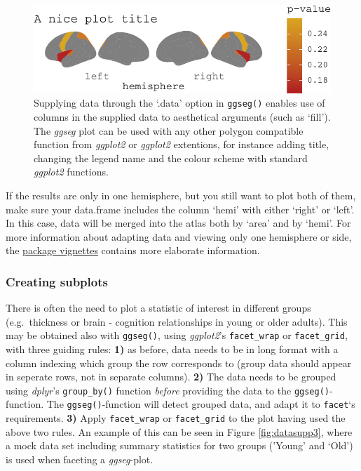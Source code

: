 \documentclass[fleqn,10pt]{wlpeerj} %
\begin{document}
\begin{figure}
\centering
\includegraphics{msc_ggseg_files/figure-latex/datasupp-1.pdf}
\caption{\label{fig:datasupp}Supplying data through the `.data' option in \texttt{ggseg()} enables use of columns in the supplied data to aesthetical arguments (such as `fill'). The \emph{ggseg} plot can be used with any other polygon compatible function from \emph{ggplot2} or \emph{ggplot2} extentions, for instance adding title, changing the legend name and the colour scheme with standard \emph{ggplot2} functions.}
\end{figure}

If the results are only in one hemisphere, but you still want to plot both of them, make sure your data.frame includes the column `hemi' with either `right' or `left'.
In this case, data will be merged into the atlas both by `area' and by `hemi'.
For more information about adapting data and viewing only one hemisphere or side, the \href{https://lcbc-uio.github.io/ggseg/articles/ggseg.html\#single-hemisphere-results}{package vignettes} contains more elaborate information.

\hypertarget{creating-subplots}{%
\subsubsection{Creating subplots}\label{creating-subplots}}

There is often the need to plot a statistic of interest in different groups (e.g.~thickness or brain - cognition relationships in young or older adults).
This may be obtained also with \texttt{ggseg()}, using \emph{ggplot2}'s \texttt{facet\_wrap} or \texttt{facet\_grid}, with three guiding rules:
\textbf{1)} as before, data needs to be in long format with a column indexing which group the row corresponds to (group data should appear in seperate rows, not in separate columns).
\textbf{2)} The data needs to be grouped using \emph{dplyr}'s \texttt{group\_by()} function \emph{before} providing the data to the \texttt{ggseg()}-function.
The \texttt{ggseg()}-function will detect grouped data, and adapt it to \texttt{facet}`s requirements.
\textbf{3)} Apply \texttt{facet\_wrap} or \texttt{facet\_grid} to the plot having used the above two rules.
An example of this can be seen in Figure \ref{fig:datasupp3}, where a mock data set including summary statistics for two groups ('Young' and `Old') is used when faceting a \emph{ggseg}-plot.
\end{document}

